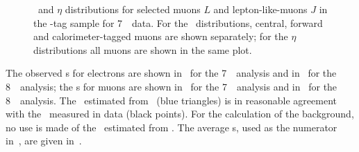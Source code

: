 \begin{figure}[h]
{        }
    \caption[\pt\ and $\eta$ distributions for selected muons $L$ and
    lepton-like-muons $J$ in the \Z-tag sample for 7~\tev\ data.]
    {\small \pt\ and $\eta$ distributions for selected muons $L$ and
    lepton-like-muons $J$ in the \Z-tag sample for 7~\tev\ data. 
    For the \pt\ distributions, central, forward and calorimeter-tagged muons are shown
    separately; for the $\eta$ distributions all muons are
    shown in the same plot.}
\label{fig:ljdist-mu-seven} 
\end{figure}

The observed \fakefactor s for electrons are shown in~ for the
7~\tev\ analysis and in~ for the 8~\tev\ analysis; the \fakefactor s
for muons are shown in~ for the
7~\tev\ analysis and in~ for the 8~\tev\ analysis. The
\ffactor\ estimated from \mc\ (blue triangles) is in reasonable agreement with
the \ffactor\ measured in data (black points). For the calculation of the
background, no use is made of the \ffactor\ estimated from \mc. The average \FF
s, used as the numerator in~, are given in~.

